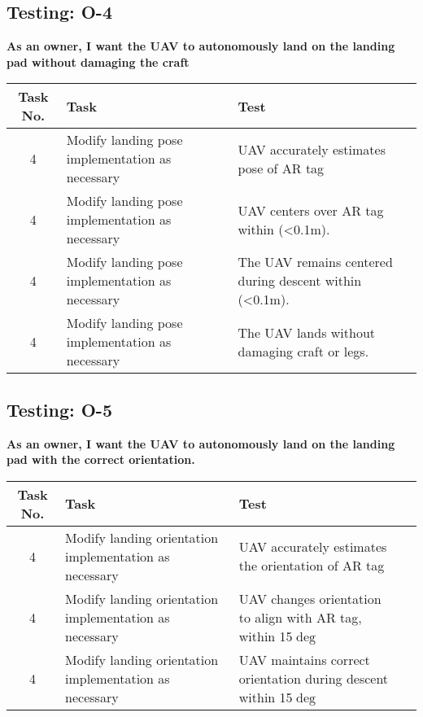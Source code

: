 \subsection{Testing: O-4}
\textbf{As an owner, I want the UAV to autonomously land on the landing pad without damaging the craft}\\
\begin{tabular}{| c | >{\raggedright}m{4cm} | m{4cm} | m{4cm} |}\hline
	Task No. & Task & Test \\\hline
	4 & Modify landing pose implementation as necessary & UAV accurately estimates pose of AR tag\\\hline
	4 & Modify landing pose implementation as necessary & UAV centers over AR tag within (\textless 0.1m).\\\hline
	4 & Modify landing pose implementation as necessary & The UAV remains centered during descent within (\textless 0.1m).\\\hline
	4 & Modify landing pose implementation as necessary & The UAV lands without damaging craft or legs.\\\hline
\end{tabular}

\subsection{Testing: O-5}
\textbf{As an owner, I want the UAV to autonomously land on the landing pad with the correct orientation.}\\
\begin{tabular}{| c | >{\raggedright}m{4cm} | m{4cm} | m{4cm} |}\hline
	Task No. & Task & Test \\\hline
		4 & Modify landing orientation implementation as necessary & UAV accurately estimates the orientation of AR tag\\ \hline
		4 & Modify landing orientation implementation as necessary & UAV changes orientation to align with AR tag, within 15$\deg$ \\ \hline
		4 & Modify landing orientation implementation as necessary & UAV maintains correct orientation during descent within 15$\deg$ \\ \hline
\end{tabular}

